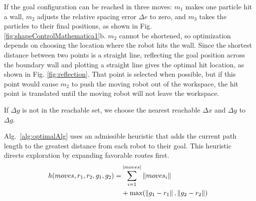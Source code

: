 If the goal configuration can be reached in three moves:  $m_1$  makes one particle hit a wall, $m_2$ adjusts the relative spacing error $\Delta e$ to zero, and  $m_3$ takes the particles to their final positions, as shown in Fig. \ref{fig:shapeControlMathematica1}b. 
$m_2$ cannot be shortened, so optimization depends on choosing the location where the robot hits the wall. 
 Since the shortest distance between two points is a straight line, reflecting the goal position across the boundary wall and plotting a straight line gives the optimal hit location, as shown in Fig. \ref{fig:reflection}.
That point is selected when possible, but if this point would cause $m_2$ to push the moving robot out of the workspace, the hit point is translated until the moving robot will not leave the workspace.

If  $\Delta g$ is not in the reachable set, we choose the nearest reachable $\Delta x$ and $\Delta y$ to $\Delta g$. 


Alg.~\ref{alg:optimalAlg} uses an admissible heuristic that adds the current path length to the greatest distance from each robot to their goal. This heuristic directs exploration by expanding favorable routes first.
\begin{align}\label{eq:admissibleHeuristic}
h(moves, r_1,r_2,g_1,g_2) =& \sum_{i=1}^{|moves|} \left\lVert moves_i\right\rVert  \\
&+  \max( \left\lVert g_1-r_1\right\rVert, \left\lVert g_2-r_2\right\rVert ) \nonumber
\end{align}


